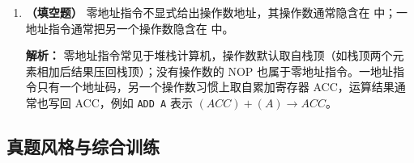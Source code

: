 \begin{enumerate}[leftmargin=*]
    \ifshowsolutions\par\noindent\textbf{解析：} (A) 是 RISC 的典型特征：定长、格式规整，便于在取指阶段就完成译码并安排流水。(B) 也符合两类机器的常见设计取向。(C) 描述的是 load-store 结构：运算类指令只在寄存器之间进行，访存由 LOAD/STORE 完成。(D) 错在「一定」：控制器用微程序还是硬布线是具体实现的选择，早期 RISC 多用硬布线，但 CISC 也可用硬布线，现代处理器还常把 CISC 指令翻译成类 RISC 微操作，不能一概而论。\else \answerarea \fi

    \vspace{8pt}

    \item \textbf{（填空题）}
    零地址指令不显式给出操作数地址，其操作数通常隐含在 \underline{\hspace{2.5cm}} 中；一地址指令通常把另一个操作数隐含在 \underline{\hspace{2cm}} 中。

    \ifshowsolutions\par\noindent\textbf{解析：} 零地址指令常见于堆栈计算机，操作数默认取自栈顶（如栈顶两个元素相加后结果压回栈顶）；没有操作数的 NOP 也属于零地址指令。一地址指令只有一个地址码，另一个操作数习惯上取自累加寄存器 ACC，运算结果通常也写回 ACC，例如 \texttt{ADD A} 表示 $(ACC)+ (A)\to ACC$。\else \answerarea \fi

\end{enumerate}

\subsection{真题风格与综合训练}

